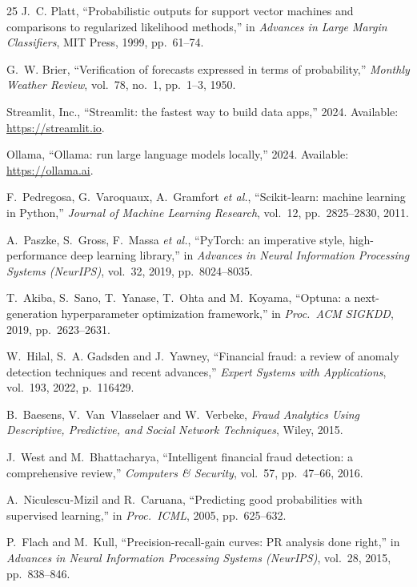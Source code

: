 \documentclass[12pt,a4paper]{article}
\begin{document}
\begin{thebibliography}{25}
J.~C. Platt, ``Probabilistic outputs for support vector machines and comparisons to regularized likelihood methods,'' in \textit{Advances in Large Margin Classifiers}, MIT Press, 1999, pp.~61--74.

G.~W. Brier, ``Verification of forecasts expressed in terms of probability,'' \textit{Monthly Weather Review}, vol.~78, no.~1, pp.~1--3, 1950.

Streamlit, Inc., ``Streamlit: the fastest way to build data apps,'' 2024. Available: \url{https://streamlit.io}.

Ollama, ``Ollama: run large language models locally,'' 2024. Available: \url{https://ollama.ai}.

F.~Pedregosa, G.~Varoquaux, A.~Gramfort \textit{et al.}, ``Scikit-learn: machine learning in Python,'' \textit{Journal of Machine Learning Research}, vol.~12, pp.~2825--2830, 2011.

A.~Paszke, S.~Gross, F.~Massa \textit{et al.}, ``PyTorch: an imperative style, high-performance deep learning library,'' in \textit{Advances in Neural Information Processing Systems (NeurIPS)}, vol.~32, 2019, pp.~8024--8035.

T.~Akiba, S.~Sano, T.~Yanase, T.~Ohta and M.~Koyama, ``Optuna: a next-generation hyperparameter optimization framework,'' in \textit{Proc.\ ACM SIGKDD}, 2019, pp.~2623--2631.

W.~Hilal, S.~A. Gadsden and J.~Yawney, ``Financial fraud: a review of anomaly detection techniques and recent advances,'' \textit{Expert Systems with Applications}, vol.~193, 2022, p.~116429.

B.~Baesens, V.~Van~Vlasselaer and W.~Verbeke, \textit{Fraud Analytics Using Descriptive, Predictive, and Social Network Techniques}, Wiley, 2015.

J.~West and M.~Bhattacharya, ``Intelligent financial fraud detection: a comprehensive review,'' \textit{Computers \& Security}, vol.~57, pp.~47--66, 2016.

A.~Niculescu-Mizil and R.~Caruana, ``Predicting good probabilities with supervised learning,'' in \textit{Proc.\ ICML}, 2005, pp.~625--632.

P.~Flach and M.~Kull, ``Precision-recall-gain curves: PR analysis done right,'' in \textit{Advances in Neural Information Processing Systems (NeurIPS)}, vol.~28, 2015, pp.~838--846.


\end{thebibliography}
\end{document}
